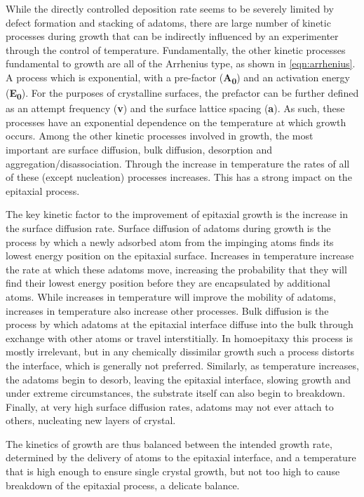 While the directly controlled deposition rate seems to be severely limited by defect formation and stacking of adatoms, there are large number of kinetic processes during growth that can be indirectly influenced by an experimenter through the control of temperature. Fundamentally, the other kinetic processes fundamental to growth are all of the Arrhenius type, as shown in \cref{eqn:arrhenius}. A process which is exponential, with a pre-factor (\textbf{A\textsubscript{0}}) and an activation energy (\textbf{E\textsubscript{0}}). For the purposes of crystalline surfaces, the prefactor can be further defined as an attempt frequency (\textbf{v}) and the surface lattice spacing (\textbf{a})\cite{Einax2013}. As such, these processes have an exponential dependence on the temperature at which growth occurs. Among the other kinetic processes involved in growth, the most important are surface diffusion, bulk diffusion, desorption and aggregation/disassociation. Through the increase in temperature the rates of all of these (except nucleation) processes increases. This has a strong impact on the epitaxial process. 

The key kinetic factor to the improvement of epitaxial growth is the increase in the surface diffusion rate. Surface diffusion of adatoms during growth is the process by which a newly adsorbed atom from the impinging atoms finds its lowest energy position on the epitaxial surface. Increases in temperature increase the rate at which these adatoms move, increasing the probability that they will find their lowest energy position before they are encapsulated by additional atoms. While increases in temperature will improve the mobility of adatoms, increases in temperature also increase other processes. Bulk diffusion is the process by which adatoms at the epitaxial interface diffuse into the bulk through exchange with other atoms or travel interstitially. In homoepitaxy this process is mostly irrelevant, but in any chemically dissimilar growth such a process distorts the interface, which is generally not preferred. Similarly, as temperature increases, the adatoms begin to desorb, leaving the epitaxial interface, slowing growth and under extreme circumstances, the substrate itself can also begin to breakdown. Finally, at very high surface diffusion rates, adatoms may not ever attach to others, nucleating new layers of crystal.

The kinetics of growth are thus balanced between the intended growth rate, determined by the delivery of atoms to the epitaxial interface, and a temperature that is high enough to ensure single crystal growth, but not too high to cause breakdown of the epitaxial process, a delicate balance.

